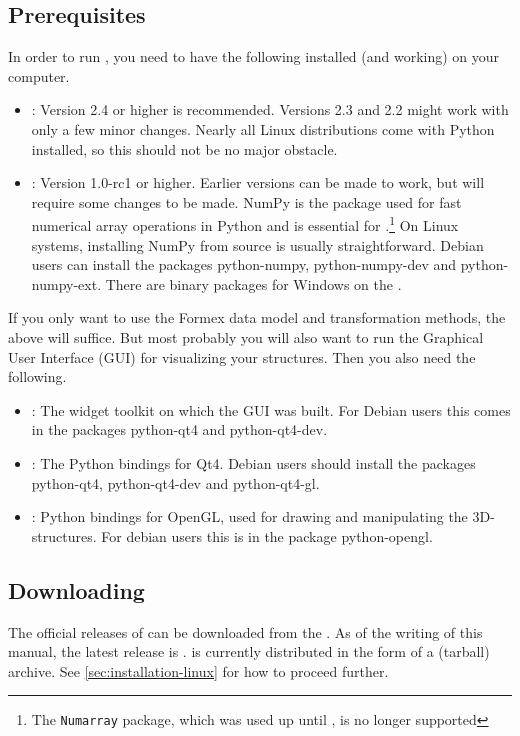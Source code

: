 \subsection{Prerequisites}
\label{sec:prerequisites}
In order to run \pyformex, you need to have the following installed (and working) on your computer.
\begin{itemize}
\item {}: Version 2.4 or higher is recommended. Versions 2.3 and 2.2 might work with only a few minor changes.
Nearly all Linux distributions come with Python installed, so this should not be no major obstacle.
\item {}: Version 1.0-rc1 or higher. Earlier versions can be made to work, but will require some changes to be made. NumPy is the package used for fast numerical array operations in Python and is essential for \pyformex.\footnote{The \texttt{Numarray} package, which was used up until , is no longer supported }
On Linux systems, installing NumPy from source is usually straightforward. Debian users can install the packages python-numpy, python-numpy-dev and python-numpy-ext. There are binary packages for Windows on the .
\end{itemize}
If you only want to use the Formex data model and transformation methods, the above will suffice. But most probably you will also want to run the \pyformex Graphical User Interface (GUI) for visualizing your structures. Then you also need the following. 
\begin{itemize}
\item {}: The widget toolkit on which the GUI was built. For Debian users this  comes in the packages python-qt4 and python-qt4-dev.
\item {}: The Python bindings for Qt4. Debian users should install the packages python-qt4, python-qt4-dev and python-qt4-gl.
\item {}: Python bindings for OpenGL, used for drawing and manipulating the 3D-structures. For debian users this is in the package python-opengl.
\end{itemize}



\subsection{Downloading}
\label{sec:downloading}
The official releases of \pyformex can be downloaded from the 
. As of the writing of this manual, the latest release is \htmladdnormallinkfoot{\pyf \release}{\latestpyf}. 
\pyformex is currently distributed in the form of a  (tarball) archive. See \ref{sec:installation-linux} for how to proceed further.

